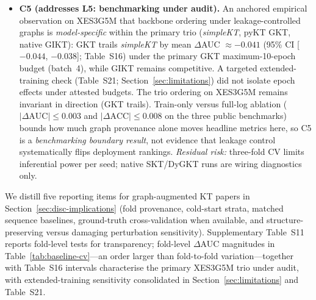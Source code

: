 \documentclass[pdflatex,sn-mathphys-num]{sn-jnl}
\newcommand{\Epre}{\ensuremath{E_{\text{pre}}}}
\newcommand{\GKTdeltaci}{[$-0.044$, $-0.038$]}
\begin{document}
\begin{itemize}
  Academy, how train-only behavioural inference of $\Epre$ agrees with the
  expert prerequisite annotation of Chang~et~al.~\cite{chang2015junyi},
  using edge-level, direction-level, and reachability-level metrics across
  a sweep of top-$K$ cutoffs.
  \emph{Residual risk:} GT cross-validation is Junyi-only at a single
  expert threshold ($\theta{=}0.5$).
  \item \textbf{C5 (addresses L5: benchmarking under audit).} An anchored
  empirical observation on XES3G5M that backbone ordering under
  leakage-controlled graphs is \emph{model-specific} within the primary trio
  (\textit{simpleKT}, pyKT GKT, native GIKT): GKT trails \textit{simpleKT} by
  mean $\Delta$AUC ${\approx}{-}0.041$ (95\% CI \GKTdeltaci{}; Table~S16) under
  the primary GKT maximum-10-epoch budget (batch~4), while GIKT remains competitive.
  A targeted extended-training check (Table~S21; Section~\ref{sec:limitations})
  did not isolate epoch effects under attested budgets.
  The trio ordering on XES3G5M remains invariant in direction (GKT trails).
  Train-only versus full-log
  ablation ($|\Delta\text{AUC}|{\leq}0.003$ and $|\Delta\text{ACC}|{\leq}0.008$
  on the three public benchmarks)
  bounds how much graph provenance alone moves headline metrics here, so C5 is
  a \emph{benchmarking boundary result}, not evidence that leakage control
  systematically flips deployment rankings.
  \emph{Residual risk:} three-fold CV limits inferential power per seed; native
  SKT/DyGKT runs are wiring diagnostics only.
\end{itemize}

We distill five reporting items for graph-augmented KT papers in
Section~\ref{sec:disc-implications} (fold provenance, cold-start strata,
matched sequence baselines, ground-truth cross-validation when available, and
structure-preserving versus damaging perturbation sensitivity).
Supplementary Table~S11 reports fold-level tests for transparency; fold-level
$\Delta$AUC magnitudes in Table~\ref{tab:baseline-cv}---an order larger than
fold-to-fold variation---together with Table~S16 intervals characterise the
primary XES3G5M trio under audit, with extended-training sensitivity consolidated
in Section~\ref{sec:limitations} and Table~S21.
\end{document}

